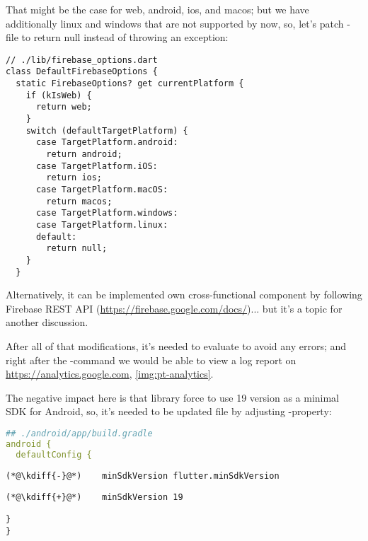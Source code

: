 \noindent That might be the case for web, android, ios, and macos; but we have additionally linux and windows that are 
not supported by now, so, let's patch -file to return null instead of throwing an exception:

\begin{lstlisting}
// ./lib/firebase_options.dart
class DefaultFirebaseOptions {
  static FirebaseOptions? get currentPlatform {
    if (kIsWeb) {
      return web;
    }
    switch (defaultTargetPlatform) {
      case TargetPlatform.android:
        return android;
      case TargetPlatform.iOS:
        return ios;
      case TargetPlatform.macOS:
        return macos;
      case TargetPlatform.windows:
      case TargetPlatform.linux:
      default:
        return null;
    }
  }
\end{lstlisting}

\noindent Alternatively, it can be implemented own cross-functional component by following Firebase REST API 
(\href{https://firebase.google.com/docs/reference/rest/database}{https://firebase.google.com/docs/})... but it's a 
topic for another discussion.

After all of that modifications, it's needed to evaluate  to avoid any errors; and right after the
-command we would be able to view a log report on 
\href{https://analytics.google.com}{https://analytics.google.com}, \cref{img:pt-analytics}.


\noindent The negative impact here is that  library force to use 19 version as a minimal SDK for 
Android, so, it's needed to be updated  file by adjusting -property:

\begin{lstlisting}[language=yaml]
## ./android/app/build.gradle
android {
  defaultConfig {
\end{lstlisting}
{
\xpretocmd{\lstlisting}{\vspace{-12pt}}{}{}
\begin{lstlisting}[firstnumber=4, backgroundcolor=\color{backred}]
(*@\kdiff{-}@*)    minSdkVersion flutter.minSdkVersion
\end{lstlisting}
\begin{lstlisting}[firstnumber=4, backgroundcolor=\color{backgreen}]
(*@\kdiff{+}@*)    minSdkVersion 19
\end{lstlisting}
\begin{lstlisting}[firstnumber=5]
  }
}
\end{lstlisting}
}

